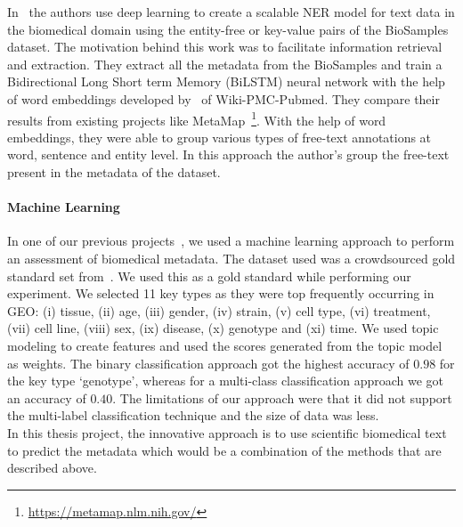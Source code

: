 In~\cite{tsui2018creating} the authors use deep learning to create a scalable NER model for text data in the biomedical domain using the entity-free or key-value pairs of the BioSamples dataset. The motivation behind this work was to facilitate information retrieval and extraction. They extract all the metadata from the BioSamples and train a Bidirectional Long Short term Memory (BiLSTM) neural network with the help of word embeddings developed by~\cite{chiu2016train} of Wiki-PMC-Pubmed. They compare their results from existing projects like MetaMap~\footnote{\url{https://metamap.nlm.nih.gov/}}. With the help of word embeddings, they were able to group various types of free-text annotations at word, sentence and entity level. In this approach the author's group the free-text present in the metadata of the dataset. 

\paragraph{Machine Learning}
In one of our previous projects~\cite{nayak2018ML}, we used a machine learning approach to perform an assessment of biomedical metadata. The dataset used was a crowdsourced gold standard set from~\cite{zaveri2017metacrowd}. We used this as a gold standard while performing our experiment. We selected 11 key types as they were top frequently occurring in GEO: (i) tissue, (ii) age, (iii) gender, (iv) strain, (v) cell type, (vi) treatment, (vii) cell line, (viii) sex, (ix) disease, (x) genotype and (xi) time. We used topic modeling to create features and used the scores generated from the topic model as weights. The binary classification approach got the highest accuracy of $0.98$ for the key type `genotype', whereas for a multi-class classification approach we got an accuracy of $0.40$. The limitations of our approach were that it did not support the multi-label classification technique and the size of data was less. \\ 

In this thesis project, the innovative approach is to use scientific biomedical text to predict the metadata which would be a combination of the methods that are described above. 

